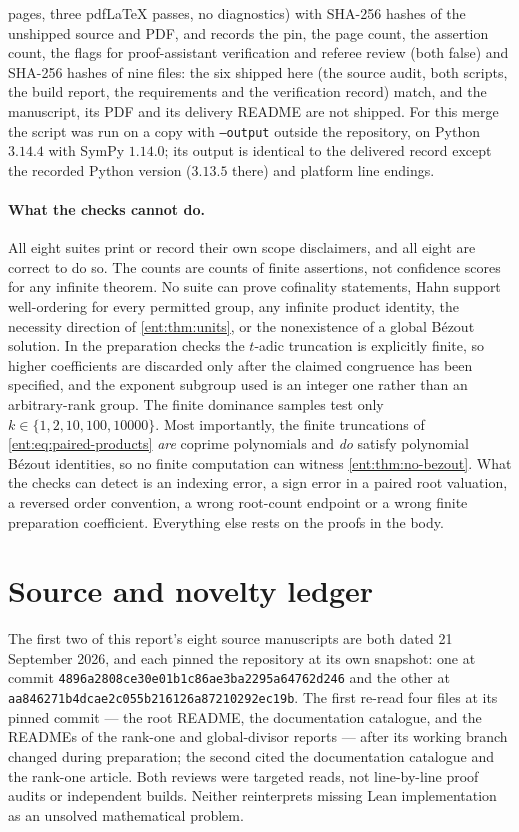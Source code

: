 \documentclass[11pt]{article}
\theoremstyle{plain}
\theoremstyle{plain}
\theoremstyle{plain}
\theoremstyle{definition}
\theoremstyle{definition}
\theoremstyle{definition}
\theoremstyle{definition}
\theoremstyle{remark}
\begin{document}
pages, three pdfLaTeX passes, no diagnostics) with SHA-256 hashes of the
unshipped source and PDF, and
 records the pin,
the page count, the assertion count, the flags for proof-assistant
verification and referee review (both false) and SHA-256 hashes of nine files:
the six shipped here (the source audit, both scripts, the build report, the
requirements and the verification record) match, and the manuscript, its PDF
and its delivery README are not shipped. For this merge the script was run on
a copy with \texttt{--output} outside the repository, on Python $3.14.4$ with
SymPy $1.14.0$; its output is identical to the delivered record except the
recorded Python version ($3.13.5$ there) and platform line endings.

\paragraph{What the checks cannot do.}
All eight suites print or record their own scope disclaimers, and all eight
are correct to do so.
The counts are counts of finite assertions, not confidence scores for any
infinite theorem. No suite can prove cofinality statements, Hahn support
well-ordering for every permitted group, any infinite product identity, the
necessity direction of \cref{ent:thm:units}, or the nonexistence of a global
B\'ezout solution. In the preparation checks the $t$-adic truncation is
explicitly finite, so higher coefficients are discarded only after the
claimed congruence has been specified, and the exponent subgroup used is an
integer one rather than an arbitrary-rank group. The finite dominance samples
test only $k\in\{1,2,10,100,10000\}$. Most importantly, the finite
truncations of \eqref{ent:eq:paired-products} \emph{are} coprime polynomials
and \emph{do} satisfy polynomial B\'ezout identities, so no finite
computation can witness \cref{ent:thm:no-bezout}. What the checks can detect
is an indexing error, a sign error in a paired root valuation, a reversed
order convention, a wrong root-count endpoint or a wrong finite preparation
coefficient. Everything else rests on the proofs in the body.

\section{Source and novelty ledger}
\label{ent:app:sources}
The first two of this report's eight source manuscripts are both dated
21 September 2026, and each pinned the repository at its own snapshot: one at commit
\texttt{4896a2808ce30e01b1c8\allowbreak 6ae3ba2295a64762d246} and the other at
\texttt{aa846271b4dcae2c055b\allowbreak 216126a87210292ec19b}. The first re-read four
files at its pinned commit --- the root README, the documentation catalogue,
and the READMEs of the rank-one and global-divisor reports --- after its
working branch changed during preparation; the second cited the documentation
catalogue and the rank-one article. Both reviews were targeted reads, not
line-by-line proof audits or independent builds. Neither reinterprets missing
Lean implementation as an unsolved mathematical problem.
\end{document}
